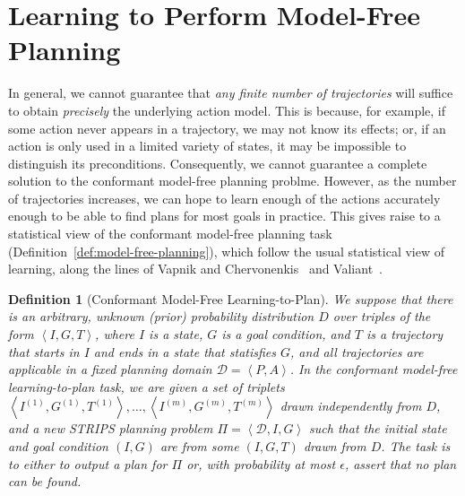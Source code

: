\documentclass[letterpaper]{article}
\newtheorem{definition}{Definition}
\newcommand{\tuple}[1]{\ensuremath{\left \langle #1 \right \rangle }}
\begin{document}
\section{Learning to Perform Model-Free Planning}
In general, we cannot guarantee that {\em any finite number of trajectories} will suffice to obtain {\em precisely} the underlying action model. This is because, for example, if some action never appears in a trajectory, we may not know its effects; or, if an action is only used in a limited variety of states, it may be impossible to distinguish its preconditions. Consequently, we cannot guarantee a complete solution to the conformant model-free planning problme. However, as the number of trajectories increases, we can hope to learn enough of the actions accurately enough to be able to find plans for most goals in practice. This gives raise to a statistical view of the conformant model-free planning task (Definition~\ref{def:model-free-planning}), which follow the usual statistical view of learning, along the lines of Vapnik and Chervonenkis~ and Valiant~.  %

\begin{definition}[Conformant Model-Free Learning-to-Plan] We suppose that there is an arbitrary, unknown (prior) probability distribution $D$ over triples of the form $\tuple{I,G,T}$, where $I$ is a state, $G$ is a goal condition, and $T$ is a trajectory that starts in $I$ and ends in a state that statisfies $G$, 
and all trajectories are applicable in a fixed planning domain $\mathcal{D}=\tuple{P,A}$. 
In the conformant model-free learning-to-plan task, we are given a set of triplets $\tuple{I^{(1)},G^{(1)},T^{(1)}},\ldots,\tuple{I^{(m)},G^{(m)},T^{(m)}}$ drawn independently from $D$, 
and a new STRIPS planning problem $\Pi=\tuple{\mathcal{D}, I, G}$  
such that the initial state and goal condition $(I,G)$ are from some $(I,G,T)$ drawn from $D$. 
The task is to either to output a plan for $\Pi$ or, with probability at most $\epsilon$, assert that no plan can be found.
\end{definition}
\end{document}
